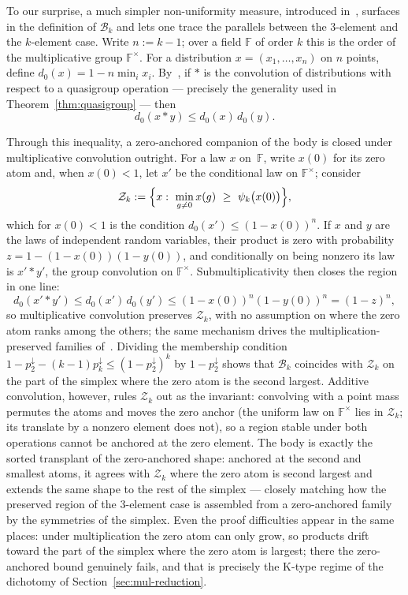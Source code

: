 \documentclass[11pt]{article}
\theoremstyle{definition}
\theoremstyle{remark}
\newcommand{\F}{\mathbb{F}}
\newcommand{\body}{\mathcal{B}}
\newcommand{\down}{\downarrow}
\begin{document}
To our surprise, a much simpler non-uniformity measure, introduced
in~\cite{yashunsky2023}, surfaces in the definition of $\body_k$ and
lets one trace the parallels between the 3-element and the $k$-element
case.  Write $n:=k-1$; over a field $\F$ of order $k$ this is the order
of the multiplicative group $\F^\times$.  For a distribution
$x=(x_1,\dots,x_n)$ on $n$ points, define $d_0(x) = 1 - n\min_i x_i$.
By~\cite[Theorem~5]{yashunsky2023}, if $*$ is the convolution of
distributions with respect to a quasigroup operation --- precisely the
generality used in Theorem~\ref{thm:quasigroup} --- then
\[
 d_0(x * y)\le d_0(x)\,d_0(y).
\]

Through this inequality, a zero-anchored companion of the body is
closed under multiplicative convolution outright.  For a law $x$
on~$\F$, write $x(0)$ for its zero atom and, when $x(0)<1$, let $x'$ be
the conditional law on $\F^\times$; consider
\[
 \mathcal Z_k:=\Bigl\{x:\ \min_{g\ne0}x(g)\ \ge\ \psi_k\bigl(x(0)\bigr)\Bigr\},
\]
which for $x(0)<1$ is the condition
$d_0(x')\le(1-x(0))^{n}$.  If $x$ and $y$ are the laws of independent
random variables, their product is zero with probability
$z=1-(1-x(0))(1-y(0))$, and conditionally on being nonzero its law is
$x'*y'$, the group convolution on $\F^\times$.  Submultiplicativity
then closes the region in one line:
\[
 d_0(x'*y')\le d_0(x')\,d_0(y')
 \le(1-x(0))^{n}(1-y(0))^{n}=(1-z)^{n},
\]
so multiplicative convolution preserves $\mathcal Z_k$, with no
assumption on where the zero atom ranks among the others; the same
mechanism drives the multiplication-preserved families
of~\cite{yashunsky2021}.  Dividing the membership condition
$1-p_2^\down-(k-1)p_k^\down\le(1-p_2^\down)^k$ by $1-p_2^\down$ shows
that $\body_k$ coincides with $\mathcal Z_k$ on the part of the simplex
where the zero atom is the second largest.  Additive convolution,
however, rules $\mathcal Z_k$ out as the invariant: convolving with a
point mass permutes the atoms and moves the zero anchor (the uniform
law on $\F^\times$ lies in $\mathcal Z_k$; its translate by a nonzero
element does not), so a region stable under both operations cannot be
anchored at the zero element.  The body is exactly the sorted
transplant of the zero-anchored shape: anchored at the second and
smallest atoms, it agrees with $\mathcal Z_k$ where the zero atom is
second largest and extends the same shape to the rest of the simplex
--- closely matching how the preserved region of the 3-element case is
assembled from a zero-anchored family by the symmetries of the simplex.
Even the proof difficulties appear in the same places: under
multiplication the zero atom can only grow, so products drift toward
the part of the simplex where the zero atom is largest; there the
zero-anchored bound genuinely fails, and that is precisely the K-type
regime of the dichotomy of Section~\ref{sec:mul-reduction}.
\end{document}
